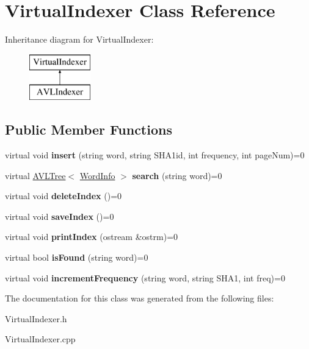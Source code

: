 \hypertarget{class_virtual_indexer}{\section{Virtual\+Indexer Class Reference}
\label{class_virtual_indexer}
}
Inheritance diagram for Virtual\+Indexer\+:\begin{figure}[H]
\begin{center}
\leavevmode
\includegraphics[height=2.000000cm]{class_virtual_indexer}
\end{center}
\end{figure}
\subsection*{Public Member Functions}
\begin{DoxyCompactItemize}
\item 
\hypertarget{class_virtual_indexer_a0630edbf3b068b8ad965025f61bc665b}{virtual void {\bfseries insert} (string word, string S\+H\+A1id, int frequency, int page\+Num)=0}\label{class_virtual_indexer_a0630edbf3b068b8ad965025f61bc665b}

\item 
\hypertarget{class_virtual_indexer_a24d704d5f93194c9049312f22af38637}{virtual \hyperlink{class_a_v_l_tree}{A\+V\+L\+Tree}$<$ \hyperlink{class_word_info}{Word\+Info} $>$ {\bfseries search} (string word)=0}\label{class_virtual_indexer_a24d704d5f93194c9049312f22af38637}

\item 
\hypertarget{class_virtual_indexer_a0f0b049e96a7fa3db62eac06d3d6c9d4}{virtual void {\bfseries delete\+Index} ()=0}\label{class_virtual_indexer_a0f0b049e96a7fa3db62eac06d3d6c9d4}

\item 
\hypertarget{class_virtual_indexer_a1cfb2760b2f51d21671b1c3fa1680171}{virtual void {\bfseries save\+Index} ()=0}\label{class_virtual_indexer_a1cfb2760b2f51d21671b1c3fa1680171}

\item 
\hypertarget{class_virtual_indexer_a4fcc7182a66a4e5c5d487043b3b638c2}{virtual void {\bfseries print\+Index} (ostream \&ostrm)=0}\label{class_virtual_indexer_a4fcc7182a66a4e5c5d487043b3b638c2}

\item 
\hypertarget{class_virtual_indexer_aafb98704c4cccc89b718a824c60c8360}{virtual bool {\bfseries is\+Found} (string word)=0}\label{class_virtual_indexer_aafb98704c4cccc89b718a824c60c8360}

\item 
\hypertarget{class_virtual_indexer_aa3b42a4556152954840137864b892315}{virtual void {\bfseries increment\+Frequency} (string word, string S\+H\+A1, int freq)=0}\label{class_virtual_indexer_aa3b42a4556152954840137864b892315}

\end{DoxyCompactItemize}


The documentation for this class was generated from the following files\+:\begin{DoxyCompactItemize}
\item 
Virtual\+Indexer.\+h\item 
Virtual\+Indexer.\+cpp\end{DoxyCompactItemize}

